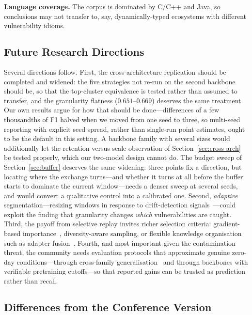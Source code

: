 \documentclass[a4paper,twoside]{article}
\begin{document}
\textbf{Language coverage.} The corpus is dominated by C/C++ and Java, so conclusions may not transfer to, say, dynamically-typed ecosystems with different vulnerability idioms.

\subsection{Future Research Directions}
\label{sec:disc-future}

\noindent
Several directions follow. First, the cross-architecture replication should be completed and widened: the five strategies not re-run on the second backbone should be, so that the top-cluster equivalence is tested rather than assumed to transfer, and the granularity flatness ($0.651$--$0.669$) deserves the same treatment. Our own results argue for how that should be done---differences of a few thousandths of F1 halved when we moved from one seed to three, so multi-seed reporting with explicit seed spread, rather than single-run point estimates, ought to be the default in this setting. A backbone family with several sizes would additionally let the retention-versus-scale observation of Section~\ref{sec:cross-arch} be tested properly, which our two-model design cannot do. The budget sweep of Section~\ref{sec:buffer} deserves the same widening: three points fix a direction, but locating where the exchange turns---and whether it turns at all before the buffer starts to dominate the current window---needs a denser sweep at several seeds, and would convert a qualitative control into a calibrated one. Second, \emph{adaptive} segmentation---resizing windows in response to drift-detection signals~\citep{Hinder2024ConceptDrift}---could exploit the finding that granularity changes \emph{which} vulnerabilities are caught. Third, the payoff from selective replay invites richer selection criteria: gradient-based importance~\citep{Aljundi2019MIR}, diversity-aware sampling, or flexible knowledge organisation such as adapter fusion~\citep{Pfeiffer2021AdapterFusion}. Fourth, and most important given the contamination threat, the community needs evaluation protocols that approximate genuine zero-day conditions---through cross-family generalisation~\citep{Lu2021CodeXGLUE,Morrison2015HotSOS} and through backbones with verifiable pretraining cutoffs---so that reported gains can be trusted as prediction rather than recall.

\subsection{Differences from the Conference Version}
\label{sec:differences}
\end{document}
